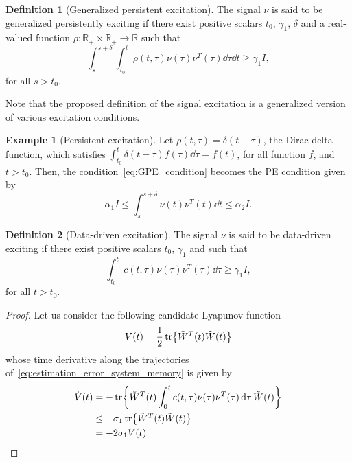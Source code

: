 \documentclass[]{IEEEtran}
\theoremstyle{definition}
\newtheorem{definition}{Definition}
\newtheorem{example}{Example}
\theoremstyle{remark}
\newcommand{\MB}[1]{\mathbb{#1}}
\begin{document}
\begin{definition}[Generalized persistent excitation]
	The signal $\nu$ is said to be generalized persistently exciting if there
	exist positive scalars $t_0$, $\gamma_1$, $\delta$ and a real-valued function
	$\rho : \MB{R}_{+} \times \MB{R}_{+} \to \MB{R}$ such that
	\begin{equation}\label{eq:GPE_condition}
		\int_s^{s+\delta} \int_{t_0}^t \rho(t, \tau) \nu(\tau) \nu^T(\tau)
		\dd{\tau} \dd{t} \ge \gamma_1 I,
	\end{equation}
	for all $s > t_0$.
\end{definition}

Note that the proposed definition of the signal excitation is a generalized
version of various excitation conditions.

\begin{example}[Persistent excitation]
	Let $\rho(t, \tau) = \delta(t - \tau)$, the Dirac delta function, which
	satisfies $\int_{t_0}^t \delta(t - \tau) f(\tau) \dd{\tau} = f(t)$, for all
	function $f$, and $t > t_0$. Then, the condition~\eqref{eq:GPE_condition}
	becomes the PE condition given by
	\begin{equation*}
		\alpha_1 I \le \int_s^{s+\delta} \nu(t) \nu^T(t) \dd{t} \le \alpha_2 I.
	\end{equation*}
\end{example}


\begin{definition}[Data-driven excitation]
	The signal $\nu$ is said to be data-driven exciting if there
	exist positive scalars $t_0$, $\gamma_1$ and such that
	\begin{equation}
		\int_{t_0}^t c(t, \tau) \nu(\tau) \nu^T(\tau) \dd{\tau} \ge \gamma_1 I,
	\end{equation}
	for all $t > t_0$.
\end{definition}

\begin{proof}
	Let us consider the following candidate Lyapunov function
	\begin{equation}
		V(t) = \frac{1}{2} \tr{\tilde{W}^T(t) \tilde{W}(t)}
	\end{equation}
	whose time derivative along the trajectories
	of~\eqref{eq:estimation_error_system_memory} is given by
	\begin{align*}
		\dot{V}(t) &= - \tr{\tilde{W}^T(t) \int_0^t c(t, \tau) \nu(\tau)
		\nu^T(\tau) \dd{\tau} \tilde{W}(t)} \\
		&\le - \sigma_1 \tr{\tilde{W}^T(t) \tilde{W}(t)} \\
		&= - 2 \sigma_1 V(t)
	\end{align*}
\end{proof}





\end{document}
